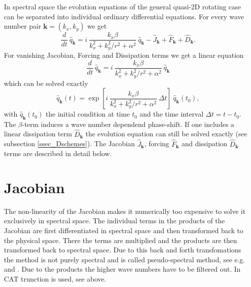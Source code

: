 In spectral space the evolution equations of the general quasi-2D 
rotating case can be separated into individual ordinary differential 
equations. For every wave number pair $\mathbf{k} = (k_{x},k_{y})$ we get
\begin{equation}  \label{eq_evolqhat}
  \frac{d}{dt} \ \hat{q}_{\mathbf{k}}
   =
   i \ \frac{k_{x} \beta}{k_{x}^{2} + k_{y}^{2}/r^{2} + \alpha^{2}} 
     \ \hat{q}_{\mathbf{k}}
   -   \hat{J}_{\mathbf{k}}
   +   \hat{F}_{\mathbf{k}}
   +   \hat{D}_{\mathbf{k}}.
\end{equation}
For vanishing Jacobian, Forcing and Dissipation terms we get a linear 
equation
\begin{equation}  \label{eq_evolqhat_lin}
  \frac{d}{dt} \ \hat{q}_{\mathbf{k}}
   =
   i \ \frac{k_{x} \beta}{k_{x}^{2} + k_{y}^{2}/r^{2} + \alpha^{2}} 
     \ \hat{q}_{\mathbf{k}}
\end{equation}
which can be solved exactly 
\begin{equation} \label{eq_qhatbetasol}
 \hat{q}_{\mathbf{k}}(t)
  = 
 \exp
  \left[
   i \ \frac{k_{x} \beta}{k_{x}^{2} + k_{y}^{2}/r^{2} + \alpha^{2}} \
   \Delta t 
  \right] 
 \ \hat{q}_{\mathbf{k}}(t_{0}),
\end{equation}
with $\hat{q}_{\mathbf{k}}(t_{0})$ the initial condition at time $t_{0}$
and the time interval $\Delta t = t - t_{0}$. The $\beta$-term induces
a wave number dependend phase-shift. If one includes a linear
dissipation term $\hat{D}_{\mathbf{k}}$ the evolution equation can still 
be solved exactly (see subsection \ref{ssec_Dschemes}). The Jacobian 
$\hat{J}_{\mathbf{k}}$, forcing $\hat{F}_{\mathbf{k}}$ and dissipation 
$\hat{D}_{\mathbf{k}}$ terms are described in detail below.
%
\section{Jacobian} \label{sec_jacobian} 
%
The non-linearity of the Jacobian makes it numerically too expensive 
to solve it exclusively in spectral space. The individual terms in 
the products of the Jacobian are first differentiated in spectral
space and then transformed back to the physical space. There the terms 
are multiplied and the products are then transformed back to spectral 
space. Due to this back and forth transfomations the method is not  
purely spectral and is called pseudo-spectral method, see e.g.\ 
\cite{kreissandoliger1972} and \cite{orszag1972}. Due to the products 
the higher wave numbers have to be filtered out. In CAT trunction is 
used, see above. 

